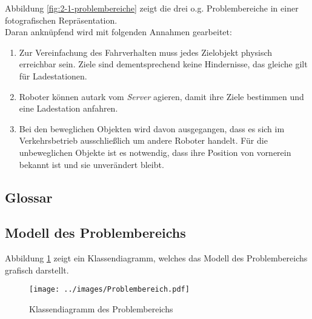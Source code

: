 		Abbildung \ref{fig:2-1-problembereiche} zeigt die drei o.g. Problembereiche in einer fotografischen Repräsentation.\\


		Daran anknüpfend wird mit folgenden Annahmen gearbeitet:

		\begin{enumerate}
		\item
			Zur Vereinfachung des Fahrverhalten muss jedes Zielobjekt physisch
			erreichbar sein. Ziele sind dementsprechend keine Hindernisse, das
			gleiche gilt für Ladestationen.
		\item
			Roboter können autark vom \emph{Server} agieren, damit ihre Ziele
			bestimmen und eine Ladestation anfahren.
		\item
			Bei den beweglichen Objekten wird davon ausgegangen, dass es sich im
			Verkehrsbetrieb ausschließlich um andere Roboter handelt. Für die
			unbeweglichen Objekte ist es notwendig, dass ihre Position von
			vornerein bekannt ist und sie unverändert bleibt.
		\end{enumerate}

		\subsection{Glossar}


		
		
		
		\subsection{Modell des Problembereichs}
		Abbildung \ref{fig:2-3-modell-problembereich} zeigt ein Klassendiagramm, welches das Modell des Problembereichs grafisch darstellt.
		\begin{figure}[H]
			\centering
			\texttt{[image: ../images/Problembereich.pdf]}
			\caption{Klassendiagramm des Problembereichs}
			\label{fig:2-3-modell-problembereich}
		\end{figure}

